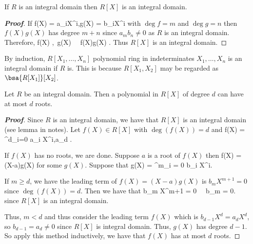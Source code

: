 \begin{lemma}
If $R$ is an integral domain then $R[X]$ is an integral domain.
\end{lemma}
\begin{proof}[\bf Proof]
If
\be
f(X) = \sum a_iX^i,\quad\quad g(X) = \sum b_iX^i
\ee
with $\deg f = m$ and $\deg g = n$ then $f(X)g(X)$ has degree $m+n$ since $a_mb_n \neq 0$ as $R$ is an integral domain. Therefore,
\be
f(X) ,\ g(X)  \ \ra\ f(X)g(X) .%
\ee
Thus $R[X]$ is an integral domain.
\end{proof}

\begin{remark}
By induction, $R[X_1,\dots ,X_n]$ polynomial ring in indeterminates $X_1,\dots ,X_n$ is an integral domain if $R$ is. This is because $R[X_1,X_2]$ may be regarded as $\bsa{R[X_1]}[X_2]$.
\end{remark}

\begin{theorem}\label{thm:lagrange_ring}
Let $R$ be an integral domain. Then a polynomial in $R[X]$ of degree $d$ can have at most $d$ roots.
\end{theorem}

\begin{proof}[\bf Proof]
Since $R$ is an integral domain, we have that $R[X]$ is an integral domain (see lemma in notes). Let $f(X)\in R[X]$ with $\deg(f(X))=d$ and
\be
f(X) = \sum^d_{i=0} a_i X^i,\quad a_d  .
\ee

If $f(X)$ has no roots, we are done. Suppose $a$ is a root of $f(X)$ then
\be
f(X) = (X-a)g(X)
\ee
for some $g(X)$. Suppose that
\be
g(X) = \sum^m_{i = 0} b_i X^i.
\ee

If $m \geq d$, we have the leading term of $f(X) = (X-a)g(X)$ is $b_m X^{m+1} = 0$ since $\deg(f(X)) = d$. Then we have that
\be
b_m X^{m+1} = 0 \ \ra \ b_m = 0.
\ee
since $R[X]$ is an integral domain.

Thus, $m<d$ and thus consider the leading term $f(X)$ which is $b_{d-1}X^d = a_d X^d$, so $b_{d-1} = a_d \neq 0$ since $R[X]$ is integral domain. Thus, $g(X)$ has degree $d-1$. So apply this method inductively, we have that $f(X)$ has at most $d$ roots.
\end{proof}


